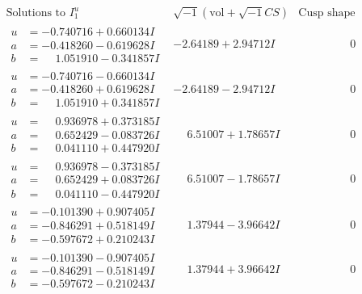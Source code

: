 \documentclass[1p]{elsarticle_modified}
\theoremstyle{definition}
\newcommand{\I}{\sqrt{-1}}
\begin{document}
$$\begin{array}{c|c|c}  
\text{Solutions to }I^u_{1}& \I (\text{vol} + \sqrt{-1}CS) & \text{Cusp shape}\\
 \hline 
\begin{aligned}
u &= -0.740716 + 0.660134 I \\
a &= -0.418260 - 0.619628 I \\
b &= \phantom{-}1.051910 - 0.341857 I\end{aligned}
 & -2.64189 + 2.94712 I & \phantom{-0.000000 } 0 \\ \hline\begin{aligned}
u &= -0.740716 - 0.660134 I \\
a &= -0.418260 + 0.619628 I \\
b &= \phantom{-}1.051910 + 0.341857 I\end{aligned}
 & -2.64189 - 2.94712 I & \phantom{-0.000000 } 0 \\ \hline\begin{aligned}
u &= \phantom{-}0.936978 + 0.373185 I \\
a &= \phantom{-}0.652429 - 0.083726 I \\
b &= \phantom{-}0.041110 + 0.447920 I\end{aligned}
 & \phantom{-}6.51007 + 1.78657 I & \phantom{-0.000000 } 0 \\ \hline\begin{aligned}
u &= \phantom{-}0.936978 - 0.373185 I \\
a &= \phantom{-}0.652429 + 0.083726 I \\
b &= \phantom{-}0.041110 - 0.447920 I\end{aligned}
 & \phantom{-}6.51007 - 1.78657 I & \phantom{-0.000000 } 0 \\ \hline\begin{aligned}
u &= -0.101390 + 0.907405 I \\
a &= -0.846291 + 0.518149 I \\
b &= -0.597672 + 0.210243 I\end{aligned}
 & \phantom{-}1.37944 - 3.96642 I & \phantom{-0.000000 } 0 \\ \hline\begin{aligned}
u &= -0.101390 - 0.907405 I \\
a &= -0.846291 - 0.518149 I \\
b &= -0.597672 - 0.210243 I\end{aligned}
 & \phantom{-}1.37944 + 3.96642 I & \phantom{-0.000000 } 0 \\ \hline\begin{aligned}

\end{aligned}
\end{array}$$
\end{document}
